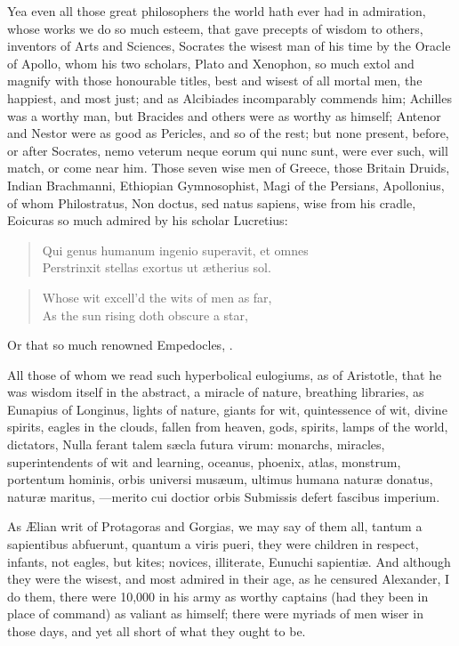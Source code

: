 {Yea even all those great philosophers the world hath ever had in
admiration, whose works we do so much esteem, that gave precepts of
wisdom to others, inventors of Arts and Sciences, Socrates the wisest
man of his time by the Oracle of Apollo, whom his two scholars,
Plato and  Xenophon, so much extol and magnify with those
honourable titles, best and wisest of all mortal men, the happiest, and
most just; and as  Alcibiades incomparably commends him; Achilles
was a worthy man, but Bracides and others were as worthy as himself;
Antenor and Nestor were as good as Pericles, and so of the rest; but
none present, before, or after Socrates, nemo veterum neque eorum qui
nunc sunt, were ever such, will match, or come near him. Those seven
wise men of Greece, those Britain Druids, Indian Brachmanni, Ethiopian
Gymnosophist, Magi of the Persians, Apollonius, of whom Philostratus,
Non doctus, sed natus sapiens, wise from his cradle, Eoicuras so much
admired by his scholar Lucretius:

\begin{verse}
Qui genus humanum ingenio superavit, et omnes\\
  Perstrinxit stellas exortus ut \ae{}therius sol.
\end{verse}

\begin{verse}
Whose wit excell'd the wits of men as far,\\
As the sun rising doth obscure a star,
\end{verse}

Or that so much renowned Empedocles, .

All those of whom we read such hyperbolical eulogiums, as of
Aristotle, that he was wisdom itself in the abstract, a miracle of
nature, breathing libraries, as Eunapius of Longinus, lights of nature,
giants for wit, quintessence of wit, divine spirits, eagles in the
clouds, fallen from heaven, gods, spirits, lamps of the world,
dictators, Nulla ferant talem s\ae{}cla futura virum: monarchs, miracles,
superintendents of wit and learning, oceanus, phoenix, atlas, monstrum,
portentum hominis, orbis universi mus\ae{}um, ultimus humana natur\ae{}
donatus, natur\ae{} maritus,
---merito cui doctior orbis
Submissis defert fascibus imperium.

As \AE{}lian writ of Protagoras and Gorgias, we may say of them all,
tantum a sapientibus abfuerunt, quantum a viris pueri, they were
children in respect, infants, not eagles, but kites; novices,
illiterate, Eunuchi sapienti\ae{}. And although they were the wisest, and
most admired in their age, as he censured Alexander, I do them, there
were 10,000 in his army as worthy captains (had they been in place of
command) as valiant as himself; there were myriads of men wiser in
those days, and yet all short of what they ought to be.

}
